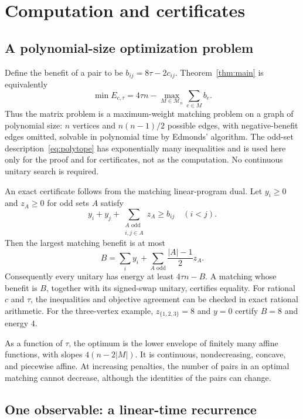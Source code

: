 \documentclass[11pt]{article}
\newcommand{\cM}{\mathcal M}
\begin{document}
\section{Computation and certificates}

\subsection{A polynomial-size optimization problem}

Define the benefit of a pair to be $b_{ij}=8\tau-2c_{ij}$.
Theorem~\ref{thm:main} is equivalently
\begin{equation}\label{eq:benefits}
 \min E_{c,\tau}=4\tau n-\max_{M\in\cM_n}\sum_{e\in M}b_e.
\end{equation}
Thus the matrix problem is a maximum-weight matching problem on a
graph of polynomial size: $n$ vertices and $n(n-1)/2$ possible edges,
with negative-benefit edges omitted, solvable in polynomial time by
Edmonds' algorithm. The odd-set description~\eqref{eq:polytope} has
exponentially many inequalities and is used here only for the proof
and for certificates, not as the computation. No continuous unitary
search is required.

An exact certificate follows from the matching linear-program dual.
Let $y_i\geq0$ and $z_A\geq0$ for odd sets $A$ satisfy
\begin{equation}\label{eq:dual}
 y_i+y_j+\sum_{\substack{A\text{ odd}\\i,j\in A}}z_A\geq b_{ij}
 \quad(i<j).
\end{equation}
Then the largest matching benefit is at most
\[
 B=\sum_i y_i+\sum_{A\text{ odd}}\frac{|A|-1}{2}z_A.
\]
Consequently every unitary has energy at least $4\tau n-B$.
A matching whose benefit is $B$, together with its signed-swap unitary,
certifies equality. For rational $c$ and $\tau$, the inequalities and
objective agreement can be checked in exact rational arithmetic.
For the three-vertex example, $z_{\{1,2,3\}}=8$ and $y=0$ certify
$B=8$ and energy $4$.

As a function of $\tau$, the optimum is the lower envelope of finitely
many affine functions, with slopes $4(n-2|M|)$. It is continuous,
nondecreasing, concave, and piecewise affine. At increasing penalties,
the number of pairs in an optimal matching cannot decrease, although
the identities of the pairs can change.

\subsection{One observable: a linear-time recurrence}
\end{document}

